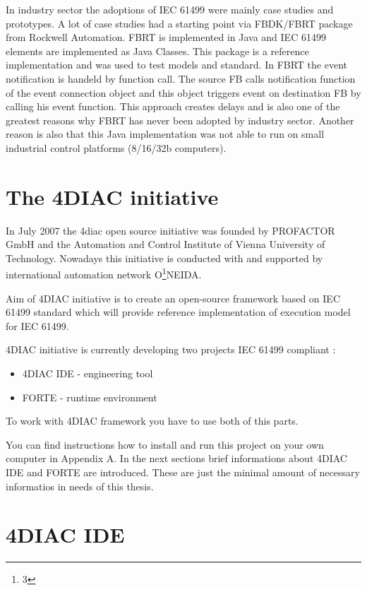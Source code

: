 In industry sector the adoptions of IEC 61499 were mainly case studies and prototypes. A lot of case studies had a starting point via FBDK/FBRT package from Rockwell Automation.
FBRT is implemented in Java and IEC 61499 elements are implemented as Java Classes. This package is a reference implementation and was used to test models and standard. In FBRT the event notification is handeld by function call. The source FB calls notification function of the event connection object and this object triggers event on destination FB by calling his event function. This approach creates delays and is also one of the greatest reasons why FBRT has never been adopted by industry sector. Another reason is also that this Java implementation was not able to run on small industrial control platforms (8/16/32b computers). 


\section{The 4DIAC initiative}

In July 2007 the 4diac open source initiative was founded by PROFACTOR GmbH and the Automation and Control Institute of Vienna University of Technology. 
Nowadays this initiative is conducted with and supported by international automation network O\footnote{3}NEIDA. 


Aim of 4DIAC initiative is to create an open-source framework based on IEC 61499 standard which will provide reference implementation of execution model for IEC 61499.

4DIAC initiative is currently developing two projects IEC 61499 compliant :
\begin{itemize}
	\item 4DIAC IDE - engineering tool
	\item FORTE - runtime environment
\end{itemize}

To work with 4DIAC framework you have to use both of this parts. 

You can find instructions how to install and run this project on your own computer in Appendix A. 
In the next sections brief informations about 4DIAC IDE and FORTE are introduced. These are just the minimal amount of necessary informatios in needs of this thesis.

\section{4DIAC IDE}

